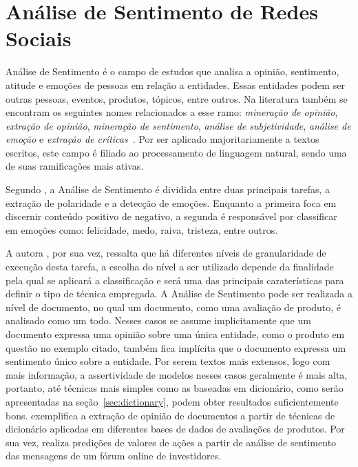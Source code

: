 \chapter{Análise de Sentimento de Redes Sociais}
\label{chapter:sentiment}

Análise de Sentimento é o campo de estudos que analisa a opinião, sentimento,
atitude e emoções de pessoas em relação a entidades.
Essas entidades podem ser outras pessoas, eventos, produtos, tópicos, entre
outros.
Na literatura também se encontram os seguintes nomes relacionados a esse ramo:
\textit{mineração de opinião}, \textit{extração de opinião},
\textit{mineração de sentimento}, \textit{análise de subjetividade},
\textit{análise de emoção} e \textit{extração de críticas}~\cite{liu15}.
Por ser aplicado majoritariamente a textos escritos, este campo é filiado
ao processamento de linguagem natural, sendo uma de suas ramificações mais
ativas.

Segundo \citet{cambria16}, a Análise de Sentimento é dividida entre duas
principais tarefas, a extração de polaridade e a detecção de emoções.
Enquanto a primeira foca em discernir conteúdo positivo de negativo, a segunda é
responsável por classificar em emoções como: felicidade, medo, raiva, tristeza,
entre outros.

A autora \citet{liu15}, por sua vez, ressalta que há diferentes níveis de
granularidade de  execução desta tarefa, a escolha do nível a ser utilizado
depende da finalidade pela qual se aplicará a classificação e será uma das
principais caraterísticas para definir o tipo de técnica empregada.
A Análise de Sentimento pode ser realizada a nível de documento, no qual um
documento, como uma avaliação de produto, é analisado como um todo.
Nesses casos se assume implicitamente que um documento expressa uma opinião
sobre uma única entidade, como o produto em questão no exemplo citado, também
fica implícita que o documento expressa um sentimento único sobre a entidade.
Por serem textos mais extensos, logo com mais informação, a assertividade de
modelos nesses casos geralmente é mais alta, portanto, até técnicas mais simples
como as baseadas em dicionário, como serão apresentadas na
seção~\ref{sec:dictionary}, podem obter resultados suficientemente bons.
\citet{taboada11} exemplifica a extração de opinião de documentos a partir de
técnicas de dicionário aplicadas em diferentes bases de dados de avaliações de
produtos.
Por sua vez, \citet{das07} realiza predições de valores de ações a partir de
análise de sentimento das mensagens de um fórum online de investidores.


